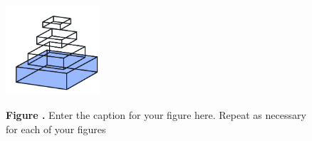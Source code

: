 \documentclass{frontiersSCNS} %
\begin{document}
\begin{figure}
\begin{center}
\includegraphics[width=3.5cm]{logo1}%
\end{center}
 \textbf{\label{fig:01} Figure .}{ Enter the caption for your figure here.  Repeat as  necessary for each of your figures }
\end{figure}

%




\end{document}
